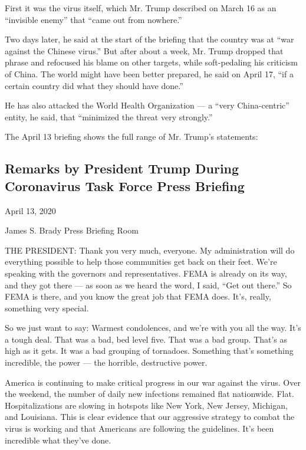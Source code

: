 First it was the virus itself, which Mr. Trump described on March 16 as
an ``invisible enemy'' that ``came out from nowhere.''

Two days later, he said at the start of the briefing that the country
was at ``war against the Chinese virus.'' But after about a week, Mr.
Trump dropped that phrase and refocused his blame on other targets,
while soft-pedaling his criticism of China. The world might have been
better prepared, he said on April 17, ``if a certain country did what
they should have done.''

He has also attacked the World Health Organization --- a ``very
China-centric'' entity, he said, that ``minimized the threat very
strongly.''

The April 13 briefing shows the full range of Mr. Trump's statements:

\hypertarget{remarks-by-president-trump-during-coronavirus-task-force-press-briefing}{%
\subsection{Remarks by President Trump During Coronavirus Task Force
Press
Briefing}\label{remarks-by-president-trump-during-coronavirus-task-force-press-briefing}}

April 13, 2020

James S. Brady Press Briefing Room

THE PRESIDENT: Thank you very much, everyone. My administration will do
everything possible to help those communities get back on their feet.
We're speaking with the governors and representatives. FEMA is already
on its way, and they got there --- as soon as we heard the word, I said,
``Get out there.'' So FEMA is there, and you know the great job that
FEMA does. It's, really, something very special.

So we just want to say: Warmest condolences, and we're with you all the
way. It's a tough deal. That was a bad, bed level five. That was a bad
group. That's as high as it gets. It was a bad grouping of tornadoes.
Something that's something incredible, the power --- the horrible,
destructive power.

America is continuing to make critical progress in our war against the
virus. Over the weekend, the number of daily new infections remained
flat nationwide. Flat. Hospitalizations are slowing in hotspots like New
York, New Jersey, Michigan, and Louisiana. This is clear evidence that
our aggressive strategy to combat the virus is working and that
Americans are following the guidelines. It's been incredible what
they've done.

